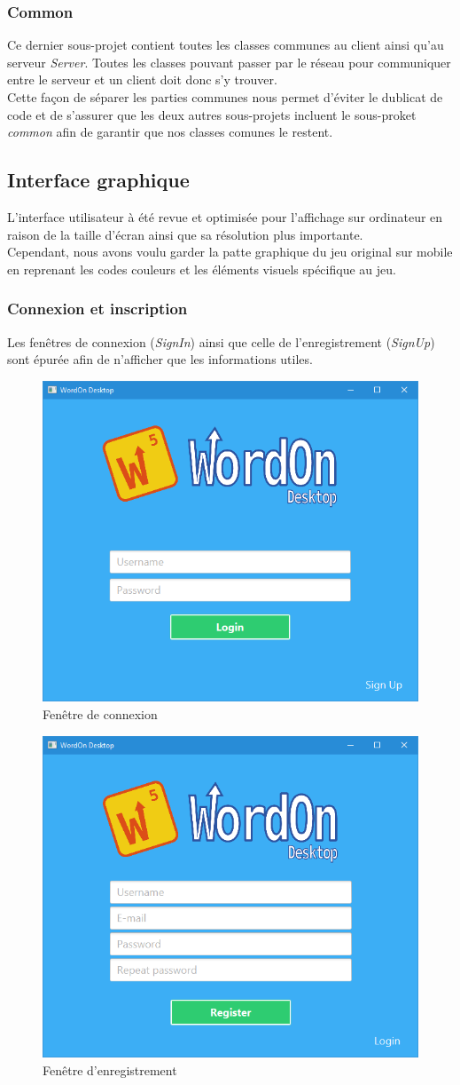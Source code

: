 \documentclass[a4paper,12pt]{article}
\begin{document}
		\subsubsection{Common}
		Ce dernier sous-projet contient toutes les classes communes au client ainsi qu'au serveur \textit{Server}. Toutes les classes pouvant passer par le réseau pour communiquer entre le serveur et un client doit donc s'y trouver. \\
		Cette façon de séparer les parties communes nous permet d'éviter le dublicat de code et de s'assurer que les deux autres sous-projets incluent le sous-proket \textit{common} afin de garantir que nos classes comunes le restent.
	
	
	\subsection{Interface graphique}
	L'interface utilisateur à été revue et optimisée pour l'affichage sur ordinateur en raison de la taille d'écran ainsi que sa résolution plus importante. \\
	Cependant, nous avons voulu garder la patte graphique du jeu original sur mobile en reprenant les codes couleurs et les éléments visuels spécifique au jeu.
	
		\subsubsection{Connexion et inscription}
		Les fenêtres de connexion (\textit{SignIn}) ainsi que celle de l'enregistrement (\textit{SignUp}) sont épurée afin de n'afficher que les informations utiles.
		
		\begin{figure}[h]
			\centering
			\includegraphics[width=0.4\linewidth]{img/signin.jpg}
			\caption{Fenêtre de connexion}
		\end{figure}
	
		\begin{figure}[h]
			\centering
			\includegraphics[width=0.4\linewidth]{img/signup.jpg}
			\caption{Fenêtre d'enregistrement}
		\end{figure}
		
\end{document}
